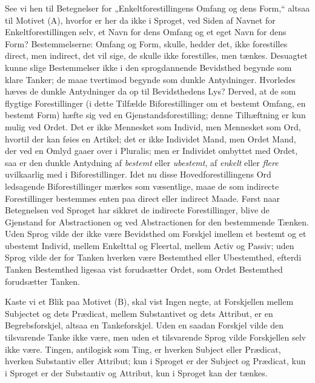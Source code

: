 \documentclass[12pt]{book}
\newcommand{\opage}[1]{\marginnote{\footnotesize\textit{[#1]}}}
\begin{document}
See vi hen til Betegnelser for „Enkeltforestillingens
Omfang og dens Form,“ altsaa til Motivet (A), hvorfor er her
da ikke i Sproget, ved Siden af Navnet for Enkeltforestillingen
selv, et Navn for dens Omfang og et eget Navn for dens
Form? Bestemmelserne: Omfang og Form, skulle, hedder det,
ikke forestilles direct, men indirect, det vil sige, de skulle ikke
forestilles, men tænkes. Desuagtet kunne slige Bestemmelser
\opage{41}ikke i den sprogdannende Bevidsthed begynde som klare Tanker;
de maae tvertimod begynde som dunkle Antydninger.
Hvorledes hæves de dunkle Antydninger da op til Bevidsthedens
Lys? Derved, at de som flygtige Forestillinger (i dette
Tilfælde Biforestillinger om et bestemt Omfang, en bestemt
Form) hæfte sig ved en Gjenstandsforestilling; denne
Tilhæftning er kun mulig ved Ordet. Det er ikke Mennesket
som Individ, men Mennesket som Ord, hvortil der kan føies
en Artikel; det er ikke Individet Mand, men Ordet Mand, der
ved en Omlyd gaaer over i Pluralis; men er Individet ombyttet
med Ordet, saa er den dunkle Antydning af \emph{bestemt} eller
\emph{ubestemt}, af \emph{enkelt} eller \emph{flere} uvilkaarlig med i
Biforestillinger. Idet nu disse Hovedforestillingens Ord ledsagende
Biforestillinger mærkes som væsentlige, maae de som indirecte
Forestillinger bestemmes enten paa direct eller indirect Maade.
Først naar Betegnelsen ved Sproget har sikkret de indirecte
Forestillinger, blive de Gjenstand for Abstractionen og ved
Abstractionen for den bestemmende Tænken. Uden Sprog
vilde der ikke være Bevidsthed om Forskjel imellem et bestemt
og et ubestemt Individ, mellem Enkelttal og Fleertal, mellem
Activ og Passiv; uden Sprog vilde der for Tanken hverken
være Bestemthed eller Ubestemthed, efterdi Tanken Bestemthed
ligesaa vist forudsætter Ordet, som Ordet Bestemthed
forudsætter Tanken.

Kaste vi et Blik paa Motivet (B), skal vist Ingen negte,
at Forskjellen mellem Subjectet og dets Prædicat, mellem
Substantivet og dets Attribut, er en Begrebsforskjel, altsaa en
Tankeforskjel. Uden en saadan Forskjel vilde den tilsvarende
Tanke ikke være, men uden et tilsvarende Sprog vilde
Forskjellen selv ikke være. Tingen, antilogisk som Ting, er hverken
Subject eller Prædicat, hverken Substantiv eller Attribut; kun
i Sproget er der Subject og Prædicat, kun i Sproget er der
Substantiv og Attribut, kun i Sproget kan der tænkes.
\end{document}
